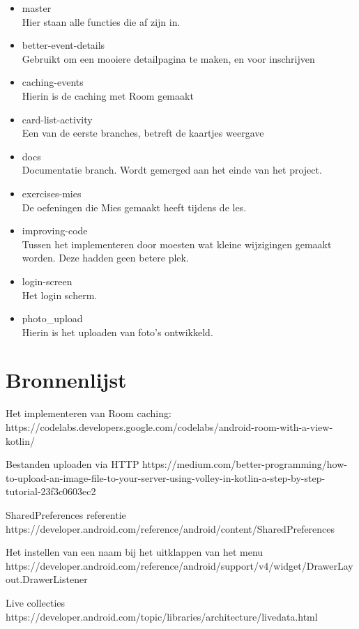 \documentclass[dutch]{report}
\begin{document}
	\begin{itemize}
		\item master\\
		Hier staan alle functies die af zijn in. 
		\item better-event-details\\
		Gebruikt om een mooiere detailpagina te maken, en voor inschrijven
		\item caching-events\\
		Hierin is de caching met Room gemaakt
		\item card-list-activity\\
		Een van de eerste branches, betreft de kaartjes weergave
		\item docs\\
		Documentatie branch. Wordt gemerged aan het einde van het project. 
		\item exercises-mies\\
		De oefeningen die Mies gemaakt heeft tijdens de les. 
		\item improving-code \\
		Tussen het implementeren door moesten wat kleine wijzigingen gemaakt worden. Deze hadden geen betere plek. 
		\item login-screen\\
		Het login scherm. 
		\item photo\_upload\\
		Hierin is het uploaden van foto's ontwikkeld.
	\end{itemize}
	
	\section{Bronnenlijst}
	Het implementeren van Room caching: 
	https://codelabs.developers.google.com/codelabs/android-room-with-a-view-kotlin/
	
	Bestanden uploaden via HTTP
	https://medium.com/better-programming/how-to-upload-an-image-file-to-your-server-using-volley-in-kotlin-a-step-by-step-tutorial-23f3c0603ec2
	
	SharedPreferences referentie
	https://developer.android.com/reference/android/content/SharedPreferences
	
	Het instellen van een naam bij het uitklappen van het menu
	https://developer.android.com/reference/android/support/v4/widget/DrawerLayout.DrawerListener
	
	Live collecties
	https://developer.android.com/topic/libraries/architecture/livedata.html
	
\end{document}
